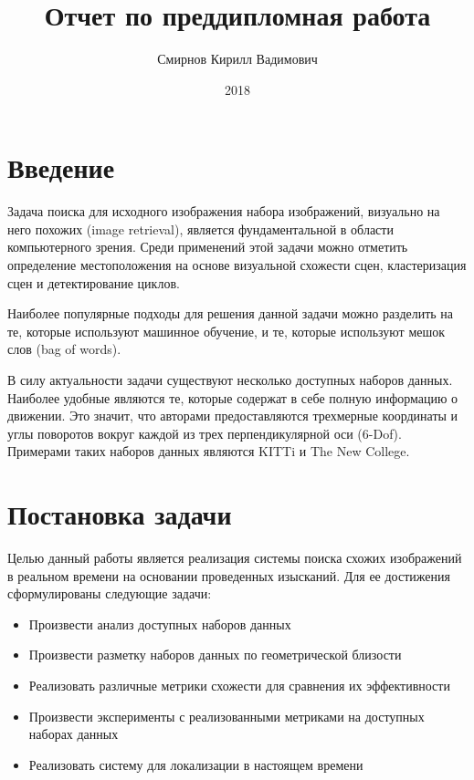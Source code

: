 \documentclass[12pt, specialist, subf, substylefile = spbu.rtx]{disser}
\begin{document}
\title{Отчет по преддипломная работа}
\author{Смирнов Кирилл Вадимович}

\date{2018}
\maketitle

\tableofcontents
\section{Введение}
Задача поиска для исходного изображения набора изображений, визуально на него похожих (image retrieval), является фундаментальной в области компьютерного зрения. Среди применений этой задачи можно отметить определение местоположения на основе визуальной схожести сцен, кластеризация сцен и детектирование циклов.
\par Наиболее популярные подходы для решения данной задачи можно разделить на те, которые используют машинное обучение, и те, которые используют мешок слов (bag of words). 
\par В силу актуальности задачи существуют несколько доступных наборов данных. Наиболее удобные являются те, которые содержат в себе полную информацию о движении. Это значит, что авторами предоставляются трехмерные координаты и углы поворотов вокруг каждой из трех перпендикулярной оси (6-Dof). Примерами таких наборов данных являются KITTi и The New College.

\newpage
\section{Постановка задачи}
Целью данный работы является реализация системы поиска схожих изображений в реальном времени на основании проведенных изысканий. Для ее достижения сформулированы следующие задачи:
\begin{itemize}
    \item Произвести анализ доступных наборов данных
    \item Произвести разметку наборов данных по геометрической близости
    \item Реализовать различные метрики схожести для сравнения их эффективности
    \item Произвести эксперименты с реализованными метриками на доступных наборах данных
    \item Реализовать систему для локализации в настоящем времени
\end{itemize}
\end{document}
